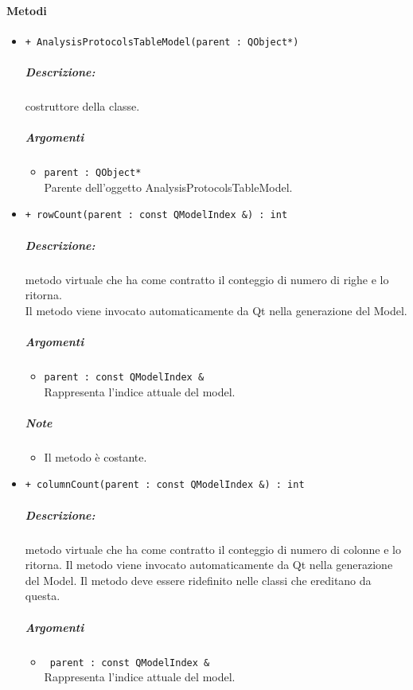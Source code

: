 \paragraph{\color{black}Metodi\\}
\begin{itemize}
	\item \color{blue}\verb!+ AnalysisProtocolsTableModel(parent : QObject*)!\\
		\color{black}
		\subparagraph{Descrizione:} costruttore della classe.\\
		\subparagraph{Argomenti}
			\begin{itemize}
				\item \color{RoyalPurple}\verb!parent : QObject*!\\
				\color{Black}Parente dell'oggetto AnalysisProtocolsTableModel.
			\end{itemize}			
	\item \color{blue}\verb!+ rowCount(parent : const QModelIndex &) : int!\\
	\color{black}
	\subparagraph{Descrizione:} metodo virtuale che ha come contratto il conteggio di numero di righe e lo ritorna.
	\\Il metodo viene invocato automaticamente da Qt\g{} nella generazione del Model.
	\subparagraph{Argomenti}
		\begin{itemize}
			\item \color{RoyalPurple}\verb!parent : const QModelIndex &!\\
			\color{Black}Rappresenta l'indice attuale del model.
		\end{itemize}
	\subparagraph{Note}
		\begin{itemize}
			\item Il metodo è costante.
		\end{itemize}	
	\item \color{blue}\verb!+ columnCount(parent : const QModelIndex &) : int!\\
	\color{black}
	\subparagraph{Descrizione:} metodo virtuale che ha come contratto il conteggio di numero di colonne e lo ritorna. Il metodo viene invocato automaticamente da Qt\g{} nella generazione del Model. Il metodo deve essere ridefinito nelle classi che ereditano da questa.
	\subparagraph{Argomenti}
		\begin{itemize}
			\item \color{RoyalPurple}\verb! parent : const QModelIndex &!\\
			\color{black}Rappresenta l'indice attuale del model.
		\end{itemize}

\end{itemize}
